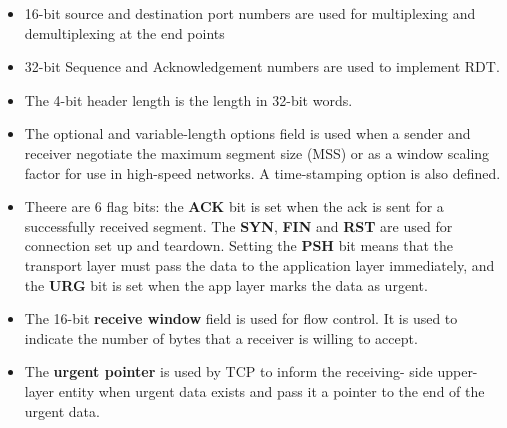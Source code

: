 \documentclass{article}
\theoremstyle{plain}
\theoremstyle{definition}
\begin{document}
\begin{itemize}
    \item 16-bit source and destination port numbers are used for multiplexing and demultiplexing at the end points
    
    \item 32-bit Sequence and Acknowledgement numbers are used to implement RDT. 
    
    \item The 4-bit header length is the length in 32-bit words. 
    
    \item The optional and variable-length options field is used when a sender and receiver negotiate the maximum segment size (MSS) or as a window scaling factor for use in high-speed networks. A time-stamping option is also defined.
    
    \item Theere are 6 flag bits: the \textbf{ACK} bit is set when the ack is sent for a successfully received segment. The \textbf{SYN}, \textbf{FIN} and \textbf{RST} are used for connection set up and teardown. Setting the \textbf{PSH} bit means that the transport layer must pass the data to the application layer immediately, and the \textbf{URG} bit is set when the app layer marks the data as urgent.
    
    \item The 16-bit \textbf{receive window} field is used for flow control. It is used to indicate the number of bytes that a receiver is willing to accept.
    
    \item The \textbf{urgent pointer} is used by TCP to inform the receiving- side upper-layer entity when urgent data exists and pass it a pointer to the end of the urgent data.
\end{itemize}
\end{document}

